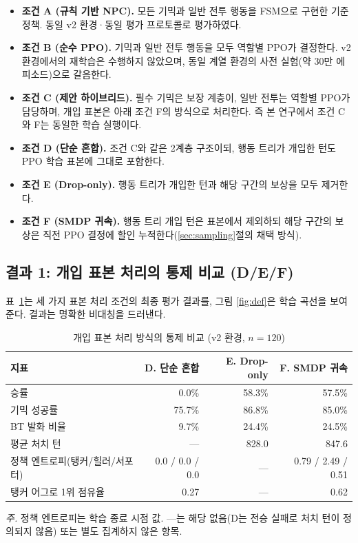 \documentclass[12pt]{article}      %
\begin{document}
\begin{itemize}[leftmargin=0.5in]
\item \textbf{조건 A (규칙 기반 NPC).} 모든 기믹과 일반 전투 행동을 FSM으로
구현한 기준 정책. 동일 v2 환경·동일 평가 프로토콜로 평가하였다.
\item \textbf{조건 B (순수 PPO).} 기믹과 일반 전투 행동을 모두 역할별 PPO가
결정한다. v2 환경에서의 재학습은 수행하지 않았으며, 동일 계열 환경의 사전
실험(약 30만 에피소드)으로 갈음한다.
\item \textbf{조건 C (제안 하이브리드).} 필수 기믹은 보장 계층이, 일반 전투는
역할별 PPO가 담당하며, 개입 표본은 아래 조건 F의 방식으로 처리한다. 즉 본
연구에서 조건 C와 F는 동일한 학습 실행이다.
\item \textbf{조건 D (단순 혼합).} 조건 C와 같은 2계층 구조이되, 행동 트리가
개입한 턴도 PPO 학습 표본에 그대로 포함한다.
\item \textbf{조건 E (Drop-only).} 행동 트리가 개입한 턴과 해당 구간의 보상을
모두 제거한다.
\item \textbf{조건 F (SMDP 귀속).} 행동 트리 개입 턴은 표본에서 제외하되 해당
구간의 보상은 직전 PPO 결정에 할인 누적한다(\ref{sec:sampling}절의 채택 방식).
\end{itemize}

\subsection{결과 1: 개입 표본 처리의 통제 비교 (D/E/F)}
\label{sec:def}

표~\ref{tab:def}는 세 가지 표본 처리 조건의 최종 평가 결과를, 그림
\ref{fig:def}은 학습 곡선을 보여 준다. 결과는 명확한 비대칭을 드러낸다.

\begin{table}[t]
\caption{개입 표본 처리 방식의 통제 비교 (v2 환경, $n=120$)}
\label{tab:def}
\begin{tabularx}{\textwidth}{Xrrr}
\toprule
지표 & D. 단순 혼합 & E. Drop-only & F. SMDP 귀속 \\
\midrule
승률 & 0.0\% & 58.3\% & 57.5\% \\
기믹 성공률 & 75.7\% & 86.8\% & 85.0\% \\
BT 발화 비율 & 9.7\% & 24.4\% & 24.5\% \\
평균 처치 턴 & --- & 828.0 & 847.6 \\
정책 엔트로피(탱커/힐러/서포터) & 0.0 / 0.0 / 0.0 & --- & 0.79 / 2.49 / 0.51 \\
탱커 어그로 1위 점유율 & 0.27 & --- & 0.62 \\
\bottomrule
\end{tabularx}
\vspace{2pt}
{\footnotesize \emph{주.} 정책 엔트로피는 학습 종료 시점 값. ---는 해당 없음(D는
전승 실패로 처치 턴이 정의되지 않음) 또는 별도 집계하지 않은 항목.}
\end{table}
\end{document}
